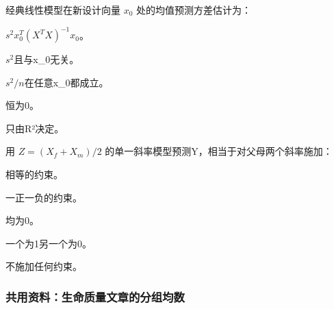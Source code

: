 \par\addvspace{6pt}\noindent\begin{minipage}{\linewidth}


经典线性模型在新设计向量 \(x_0\) 处的均值预测方差估计为：


\begin{choices}

\item \(s^2x_0^T(X^TX)^{-1}x_0\)。

\item \(s^2\)且与x\_0无关。

\item \(s^2/n\)在任意x\_0都成立。

\item 恒为0。

\item 只由R²决定。

\end{choices}

\end{minipage}\par\vspace{4pt}

\par\addvspace{6pt}\noindent\begin{minipage}{\linewidth}


用 \(Z=(X_f+X_m)/2\) 的单一斜率模型预测Y，相当于对父母两个斜率施加：


\begin{choices}

\item 相等的约束。

\item 一正一负的约束。

\item 均为0。

\item 一个为1另一个为0。

\item 不施加任何约束。

\end{choices}

\end{minipage}\par\vspace{4pt}

\subsubsection*{共用资料：生命质量文章的分组均数}

